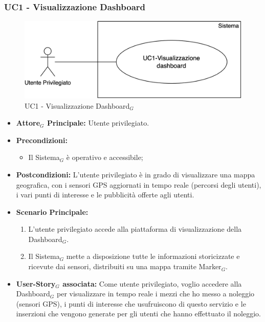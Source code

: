\documentclass[10pt]{article}
\begin{document}
\begin{justify}
\subsubsection{\textbf{UC1 - Visualizzazione Dashboard}}
\begin{figure}[H]
    \centering
    \includegraphics[width=0.7\linewidth]{UC1image.png}
    \caption{UC1 - Visualizzazione Dashboard$_G$}
    \label{fig:UC1}
\end{figure}
\begin{itemize}
    \item \textbf{Attore$_G$ Principale:} Utente privilegiato.
    \item \textbf{Precondizioni:} 
        \begin{itemize}
          \item Il Sistema$_G$ è operativo e accessibile;
        \end{itemize}
    \item \textbf{Postcondizioni:} L'utente privilegiato è in grado di visualizzare una mappa geografica, con i sensori GPS aggiornati in tempo reale (percorsi degli utenti), i vari punti di interesse e le pubblicità offerte agli utenti.
    \item \textbf{Scenario Principale:}
        \begin{enumerate}
            \item L'utente privilegiato accede alla piattaforma di visualizzazione della Dashboard$_G$.
            \item Il Sistema$_G$ mette a disposizione tutte le informazioni storicizzate e ricevute dai sensori, distribuiti su una mappa tramite Marker$_G$.
        \end{enumerate}
    \item \textbf{User-Story$_G$ associata:} Come utente privilegiato, voglio accedere alla Dashboard$_G$ per visualizzare in tempo reale i mezzi che ho messo a noleggio (sensori GPS), i punti di interesse che usufruiscono di questo servizio e le inserzioni che vengono generate per gli utenti che hanno effettuato il noleggio.
\end{itemize}



\end{justify}
\end{document}
